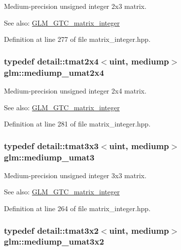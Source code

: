 Medium-precision unsigned integer 2x3 matrix. \begin{Desc}
\item[See also:]\hyperlink{group__gtc__matrix__integer}{GLM\_\-GTC\_\-matrix\_\-integer} \end{Desc}


Definition at line 277 of file matrix\_\-integer.hpp.\hypertarget{group__gtc__matrix__integer_gf79e9c80f024d31f3d66ddae75e90b6c}{
\subsubsection[mediump\_\-umat2x4]{\setlength{\rightskip}{0pt plus 5cm}typedef detail::tmat2x4$<$uint, mediump$>$ {\bf glm::mediump\_\-umat2x4}}}
\label{group__gtc__matrix__integer_gf79e9c80f024d31f3d66ddae75e90b6c}


Medium-precision unsigned integer 2x4 matrix. \begin{Desc}
\item[See also:]\hyperlink{group__gtc__matrix__integer}{GLM\_\-GTC\_\-matrix\_\-integer} \end{Desc}


Definition at line 281 of file matrix\_\-integer.hpp.\hypertarget{group__gtc__matrix__integer_g123f7d8bac8849e3a150bdf8a21e44a2}{
\subsubsection[mediump\_\-umat3]{\setlength{\rightskip}{0pt plus 5cm}typedef detail::tmat3x3$<$uint, mediump$>$ {\bf glm::mediump\_\-umat3}}}
\label{group__gtc__matrix__integer_g123f7d8bac8849e3a150bdf8a21e44a2}


Medium-precision unsigned integer 3x3 matrix. \begin{Desc}
\item[See also:]\hyperlink{group__gtc__matrix__integer}{GLM\_\-GTC\_\-matrix\_\-integer} \end{Desc}


Definition at line 264 of file matrix\_\-integer.hpp.\hypertarget{group__gtc__matrix__integer_g65a9fdb1a5918fe6f308577065983e23}{
\subsubsection[mediump\_\-umat3x2]{\setlength{\rightskip}{0pt plus 5cm}typedef detail::tmat3x2$<$uint, mediump$>$ {\bf glm::mediump\_\-umat3x2}}}
\label{group__gtc__matrix__integer_g65a9fdb1a5918fe6f308577065983e23}


